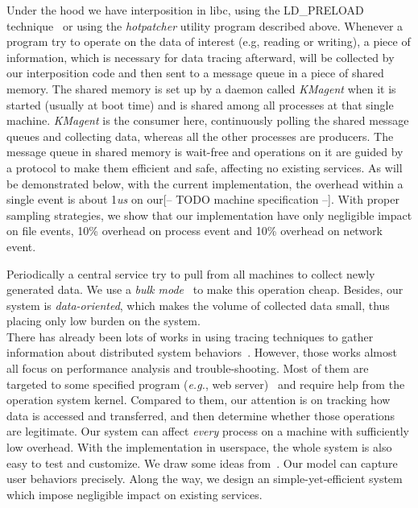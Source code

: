 \documentclass[letterpaper,twocolumn,10pt]{article}
\begin{document}
Under the hood we have interposition in libc, using the LD\_PRELOAD
technique~\cite{LD-PRELOAD-CITE} or using the \textit{hotpatcher} utility
program described above. Whenever a program try to operate on the data of
interest (e.g, reading or writing), a piece of information, which is
necessary for data tracing afterward, will be collected by our interposition
code and then sent to a message queue in a piece of shared memory. The shared
memory is set up by a daemon called \textit{KMagent} when it is started
(usually at boot time) and is shared among all processes at that single
machine. \textit{KMagent} is the consumer here, continuously polling the
shared message queues and collecting data, whereas all the other processes
are producers. The message queue in shared memory is wait-free and operations
on it are guided by a protocol to make them efficient and safe, affecting no
existing services. As will be demonstrated below, with the current
implementation, the overhead within a single event is about 1\textit{us} on
our[-- TODO machine specification --]. With proper sampling strategies, we show
that our implementation have only negligible impact on file events, 10\%
overhead on process event and 10\% overhead on network event. 

Periodically a central service try to pull from all machines to collect newly
generated data. We use a \textit{bulk mode}~\cite{jeffdeanCACM} to make this
operation cheap. Besides, our system is \textit{data-oriented}, which makes
the volume of collected data small, thus placing only low burden on the
system.\\

There has already been lots of works in using tracing techniques to gather
information about distributed system behaviors~\cite{magpie, dapper}.
However, those works almost all focus on performance analysis and
trouble-shooting. Most of them are targeted to some specified program
(\textit{e.g.}, web server)~\cite{singleprocess-oriented-paper} and require
help from the operation system kernel. Compared to them, our attention is on
tracking how data is accessed and transferred, and then determine whether
those operations are legitimate. Our system can affect \textit{every} process
on a machine with sufficiently low overhead. With the implementation in
userspace, the whole system is also easy to test and customize. We draw
some ideas from~\cite{tracenotper1, tracenotper2}. Our model can capture
user behaviors precisely. Along the way, we design an simple-yet-efficient
system which impose negligible impact on existing services.\\
\end{document}
